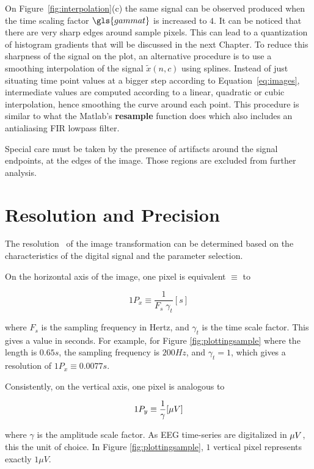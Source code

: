 On Figure~\ref{fig:interpolation}(c) the same signal can be observed produced when the time scaling factor $\gls{gammat}$ is increased to $4$. It can be noticed that there are very sharp edges around sample pixels.  This can lead to a quantization of histogram gradients that will be discussed in the next Chapter. To reduce this sharpness of the signal on the plot, an alternative procedure is to use a smoothing interpolation of the signal $\tilde{x}(n,c)$ using splines.  Instead of just situating time point values at a bigger step according to Equation~\ref{eq:images}, intermediate values are computed according to a linear, quadratic or cubic interpolation, hence smoothing the curve around each point.  This procedure is similar to what the Matlab's \textbf{resample} function does which also includes an antialiasing FIR lowpass filter.

Special care must be taken by the presence of artifacts around the signal endpoints, at the edges of the image. Those regions are excluded from further analysis.

\section{Resolution and Precision}

The resolution~\cite{Cohen2014} of the image transformation can be determined based on the characteristics of the digital signal and the parameter selection.

On the horizontal axis of the image, one pixel is equivalent $\equiv$ to 

\begin{equation}
1 P_x \equiv \frac{1}{F_s  \; \gamma_t}  [\si{s}]
\label{eq:resolutionx}
\end{equation}

\noindent where $F_s$ is the sampling frequency in Hertz, and $\gamma_t$ is the time scale factor.  This gives a value in seconds.  For example, for Figure \ref{fig:plottingsample} where the length is $0.65 s$, the sampling frequency is $200 Hz$, and $\gamma_t = 1$, which gives a resolution of $1 P_x \equiv 0.0077 s$. 

Consistently, on the vertical axis, one pixel is analogous to 

\begin{equation}
1 P_y \equiv \frac{1}{\gamma}  [\si\mu{V}]
\label{eq:resolutiony}
\end{equation}

\noindent where $\gamma$ is the amplitude scale factor.  As EEG time-series are digitalized in $\si\mu{V}$, this the unit of choice.  In Figure \ref{fig:plottingsample}, $1$ vertical pixel represents exactly $1 \mu V$.

